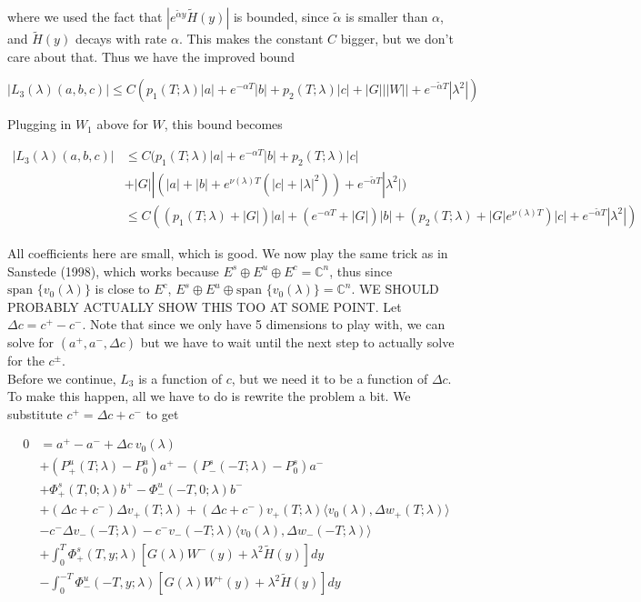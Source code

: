 \documentclass[12pt]{article}
\def\C{{\mathbb C}}
\begin{document}
\begin{enumerate}
where we used the fact that $|e^{\tilde{\alpha}y} \tilde{H}(y)|$ is bounded, since $\tilde{\alpha}$ is smaller than $\alpha$, and $\tilde{H}(y)$ decays with rate $\alpha$. This makes the constant $C$ bigger, but we don't care about that. Thus we have the improved bound

\[
|L_3(\lambda)(a, b, c)| \leq C ( p_1(T; \lambda)|a|
+ e^{-\alpha T}|b| + p_2(T; \lambda)|c| + |G|||W|| + e^{-\tilde{\alpha}T} |\lambda^2| )
\]

Plugging in $W_1$ above for $W$, this bound becomes


\begin{align*}
|L_3(\lambda)(a, b, c)| &\leq C ( p_1(T; \lambda)|a|
+ e^{-\alpha T}|b| + p_2(T; \lambda)|c| \\
&+ |G||(|a| + |b| + e^{\nu(\lambda)T}(|c| + |\lambda|^2)) + e^{-\tilde{\alpha}T}|\lambda^2| ) \\
&\leq C ( (p_1(T; \lambda) + |G|)|a| + (e^{-\alpha T} + |G|)|b| + ( p_2(T; \lambda) + |G|e^{\nu(\lambda)T})|c| + e^{-\tilde{\alpha}T}|\lambda^2| ) 
\end{align*}

All coefficients here are small, which is good. We now play the same trick as in Sanstede (1998), which works because $E^s \oplus E^u \oplus E^c = \C^n$, thus since $\text{span }\{v_0(\lambda)\}$ is close to $E^c$, $E^s \oplus E^u \oplus \text{span }\{v_0(\lambda)\} = \C^n$. WE SHOULD PROBABLY ACTUALLY SHOW THIS TOO AT SOME POINT. Let $\Delta c = c^+ - c^-$. Note that since we only have 5 dimensions to play with, we can solve for $(a^+, a^-, \Delta c)$ but we have to wait until the next step to actually solve for the $c^\pm$.\\

Before we continue, $L_3$ is a function of $c$, but we need it to be a function of $\Delta c$. To make this happen, all we have to do is rewrite the problem a bit. We substitute $c^+ = \Delta c + c^-$ to get

\begin{align*}
0 &= a^+ - a^- + \Delta c \: v_0(\lambda) \\
&+ (P^u_+(T; \lambda) - P_0^u)a^+ - (P^s_-(-T; \lambda) - P_0^s)a^- \\
&+ \Phi^s_+(T, 0; \lambda)b^+ - \Phi^u_-(-T, 0; \lambda)b^- \\
&+ (\Delta c + c^-) \Delta v_+(T; \lambda) + (\Delta c + c^-) v_+(T; \lambda) \langle v_0(\lambda), \Delta w_+(T; \lambda) \rangle \\
&- c^- \Delta v_-(-T; \lambda) - c^- v_-(-T; \lambda) \langle v_0(\lambda), \Delta w_-(-T; \lambda) \rangle \\
&+ \int_0^T \Phi^s_+(T, y; \lambda) [ G(\lambda)W^-(y) + \lambda^2 \tilde{H}(y) ] dy \\
&- \int_0^{-T} \Phi^u_-(-T, y; \lambda) [ G(\lambda)W^+(y) + \lambda^2 \tilde{H}(y) ] dy
\end{align*}


\end{enumerate}
\end{document}
